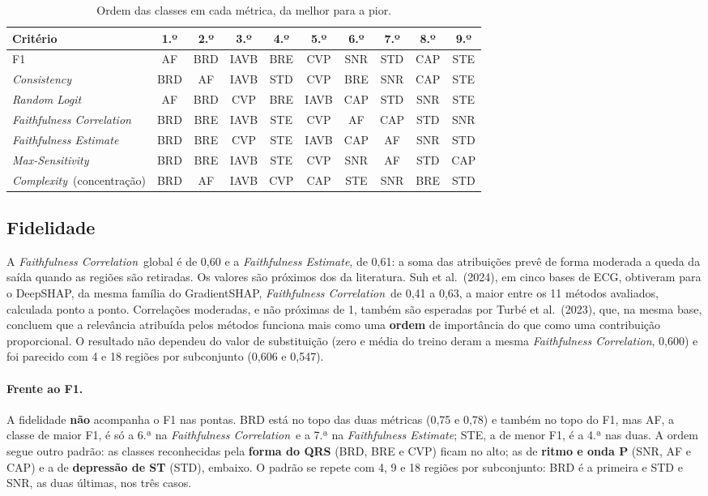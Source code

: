 \documentclass[11pt,a4paper]{article}
\newcommand{\fonte}[1]{\par\vspace{2pt}{\centering\footnotesize Fonte: #1\par}}
\newcommand{\FC}{\textit{Faithfulness Correlation}}
\newcommand{\FE}{\textit{Faithfulness Estimate}}
\newcommand{\MS}{\textit{Max-Sensitivity}}
\newcommand{\CX}{\textit{Complexity}}
\newcommand{\CS}{\textit{Consistency}}
\newcommand{\RL}{\textit{Random Logit}}
\begin{document}
\begin{table}[H]\centering\small
\caption{Ordem das classes em cada métrica, da melhor para a pior.}\label{tab:ordens}
\begin{tabular}{lccccccccc}
\toprule
\textbf{Critério} & \textbf{1.º} & \textbf{2.º} & \textbf{3.º} & \textbf{4.º} & \textbf{5.º} & \textbf{6.º} & \textbf{7.º} & \textbf{8.º} & \textbf{9.º} \\
\midrule
F1 & AF & BRD & IAVB & BRE & CVP & SNR & STD & CAP & STE \\
\midrule
\CS & BRD & AF & IAVB & STD & CVP & BRE & SNR & CAP & STE \\
\RL & AF & BRD & CVP & BRE & IAVB & CAP & STD & SNR & STE \\
\FC & BRD & BRE & IAVB & STE & CVP & AF & CAP & STD & SNR \\
\FE & BRD & BRE & CVP & STE & IAVB & CAP & AF & SNR & STD \\
\MS & BRD & BRE & IAVB & STE & CVP & SNR & AF & STD & CAP \\
\CX\ (concentração) & BRD & AF & IAVB & CVP & CAP & STE & SNR & BRE & STD \\
\bottomrule
\end{tabular}
\fonte{Dados do presente estudo.}
\end{table}

\subsection{Fidelidade}\label{sec:res-fidelidade}
A \FC\ global é de 0,60 e a \FE, de 0,61: a soma das atribuições prevê de forma moderada a queda da saída quando as regiões são retiradas. Os valores são próximos dos da literatura. Suh et al.\ (2024), em cinco bases de ECG, obtiveram para o DeepSHAP, da mesma família do GradientSHAP, \FC\ de 0,41 a 0,63, a maior entre os 11 métodos avaliados, calculada ponto a ponto. Correlações moderadas, e não próximas de 1, também são esperadas por Turbé et al.\ (2023), que, na mesma base, concluem que a relevância atribuída pelos métodos funciona mais como uma \textbf{ordem} de importância do que como uma contribuição proporcional. O resultado não dependeu do valor de substituição (zero e média do treino deram a mesma \FC, 0,600) e foi parecido com 4 e 18 regiões por subconjunto (0,606 e 0,547).

\paragraph{Frente ao F1.} A fidelidade \textbf{não} acompanha o F1 nas pontas. BRD está no topo das duas métricas (0,75 e 0,78) e também no topo do F1, mas AF, a classe de maior F1, é só a 6.ª na \FC\ e a 7.ª na \FE; STE, a de menor F1, é a 4.ª nas duas. A ordem segue outro padrão: as classes reconhecidas pela \textbf{forma do QRS} (BRD, BRE e CVP) ficam no alto; as de \textbf{ritmo e onda P} (SNR, AF e CAP) e a de \textbf{depressão de ST} (STD), embaixo. O padrão se repete com 4, 9 e 18 regiões por subconjunto: BRD é a primeira e STD e SNR, as duas últimas, nos três casos.
\end{document}
